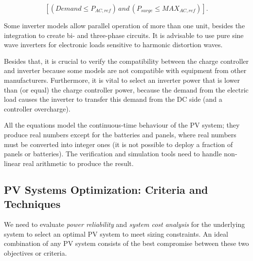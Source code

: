 \documentclass[journal]{IEEEtran}
\begin{document}
\begin{equation}
\label{eq:invcheck} 
\left[ (Demand \leq P_{AC,ref}) \, and \, (P_{surge} \leq MAX_{AC,ref}) \right].
\end{equation}

Some inverter models allow parallel operation of more than one unit, besides the integration to create bi- and three-phase circuits. It is advisable to use pure sine wave inverters for electronic loads sensitive to harmonic distortion waves.

Besides that, it is crucial to verify the compatibility between the charge controller and inverter because some models are not compatible with equipment from other manufacturers. Furthermore, it is vital to select an inverter power that is lower than (or equal) the charge controller power, because the demand from the electric load causes the inverter to transfer this demand from the DC side (and a controller overcharge).

All the equations model the continuous-time behaviour of the PV system; they produce real numbers except for the batteries and panels, where real numbers must be converted into integer ones (it is not possible to deploy a fraction of panels or batteries). The verification and simulation tools need to handle non-linear real arithmetic to produce the  result.

\subsection{PV Systems Optimization: Criteria and Techniques}

We need to evaluate \textit{power reliability} and \textit{system cost analysis} for the underlying system to select an optimal PV system to meet sizing constraints. An ideal combination of any PV system consists of the best compromise between these two objectives or criteria.
\end{document}
